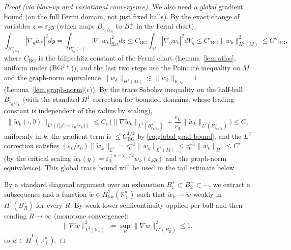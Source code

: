\documentclass[11pt,reqno,a4paper]{amsart}
\newcommand{\R}{\mathbb{R}}
\numberwithin{equation}{section}
\theoremstyle{plain}
\theoremstyle{remark}
\theoremstyle{plain}
\begin{document}
\begin{proof}[Proof (via blow-up and variational convergence)]
We also need a \emph{global} gradient bound (on the full Fermi domain, not just fixed balls).
By the exact change of variables $z=\varepsilon_k y$ (which maps $B_{r_0/\varepsilon_k}^+$ to
$B_{r_0}^+$ in the Fermi chart),
\begin{equation}\label{eq:global-grad-bound}
\int_{B_{r_0/\varepsilon_k}^+}|\nabla_y\widetilde w_k|^2dy
=\int_{B_{r_0}^+(z)}|\nabla_z w_k|^2_{\mathrm{flat}}dz
\le C_{\mathrm{BG}}\int_M|\nabla_g w_k|^2dV_g
\le C'_{\mathrm{BG}}\|w_k\|_{H^1(M)}^2\le C''_{\mathrm{BG}},
\end{equation}
where $C_{\mathrm{BG}}$ is the bilipschitz constant of the Fermi chart
(Lemma~\ref{lem:atlas}, uniform under \textup{(BG$^{2+}$)}),
and the last two steps use the Poincar\'e inequality on $M$
and the graph-norm equivalence
$\|w_k\|_{H^1(M)}\lesssim \|w_k\|_{E,g}=1$
(Lemma~\ref{lem:graph-norm}(c)).
By the trace Sobolev inequality on the half-ball $B_{r_0/\varepsilon_k}^+$
(with the standard $H^1$ correction for bounded domains,
whose leading constant is independent of the radius by scaling),
\begin{equation}\label{eq:global-trace-bound}
\|\widetilde w_k(\cdot,0)\|_{L^q(\{|y'|<r_0/\varepsilon_k\})}
\le C_n\Big(\|\nabla\widetilde w_k\|_{L^2(B_{r_0/\varepsilon_k}^+)}
+\frac{\varepsilon_k}{r_0}\|\widetilde w_k\|_{L^2(B_{r_0/\varepsilon_k}^+)}\Big)
\le C,
\end{equation}
uniformly in $k$: the gradient term is $\le C_{\mathrm{BG}}^{1/2}$ by \eqref{eq:global-grad-bound},
and the $L^2$ correction satisfies
$(\varepsilon_k/r_0)\|\widetilde w_k\|_{L^2}
=r_0^{-1}\|w_k\|_{L^2(M)}\le r_0^{-1}\|w_k\|_{H^1}\le C'$
(by the critical scaling $\widetilde w_k(y)=\varepsilon_k^{(n-2)/2}w_k(\varepsilon_k y)$
and the graph-norm equivalence).
This global trace bound will be used in the tail estimate below.

By a standard diagonal argument over an exhaustion
$B_1^+\subset B_2^+\subset\cdots$,
we extract a subsequence and a function
$\widetilde w\in H^1_{\mathrm{loc}}(\R^n_+)$ such that
$\widetilde w_k\rightharpoonup\widetilde w$
weakly in $H^1(B_R^+)$ for every $R$.
By weak lower semicontinuity applied per ball and then
sending $R\to\infty$ (monotone convergence):
\begin{equation}\label{eq:wlimit-gradient-bound}
\|\nabla\widetilde w\|_{L^2(\R^n_+)}^2
:=\sup_R\|\nabla\widetilde w\|_{L^2(B_R^+)}^2
\le1,
\end{equation}
so $\widetilde w\in\dot H^1(\R^n_+)$.


\end{proof}
\end{document}
